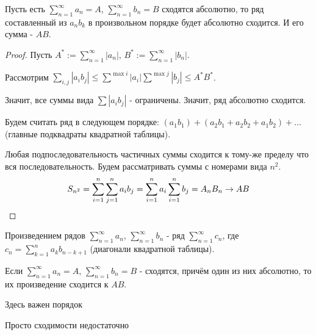 \begin{theorem} \thmslashn

    Пусть есть $\sum\limits_{n=1}^{\infty} a_{n} = A$, $\sum\limits_{n=1}^{\infty} b_{n} = B$ сходятся абсолютно, то ряд составленный из $a_{n}b_{k}$ в произвольном порядке будет абсолютно сходится. И его сумма - $AB$.
    \begin{proof} \thmslashn
    
        Пусть $A^{*} := \sum\limits_{n=1}^{\infty} |a_{n}|$, $B^{*} := \sum\limits_{n=1}^{\infty} |b_{n}|$.

        Рассмотрим $\sum\limits_{i, j} |a_{i}b_{j}| \le \sum\limits_{}^{\max i} |a_{i}| \sum\limits_{}^{\max j} |b_{j}|  \le A^{*}B^{*}$.

        Значит, все суммы вида $\sum |a_{i}b_{j}|$ - ограничены. Значит, ряд абсолютно сходится.

        Будем считать ряд в следующем порядке: $(a_1b_1) + (a_2b_1 + a_2b_2+a_1b_2) + \ldots$ (главные подквадраты квадратной таблицы).

        Любая подпоследовательность частичных суммы сходится к тому-же пределу что вся последовательность. Будем рассматривать суммы с номерами вида $n^2$.
        \begin{equation*}
            S_{n^2} = \sum\limits_{i=1}^{n}\sum\limits_{j=1}^{n} a_{i}b_{j} = \sum\limits_{i=1}^{n} a_{i} \sum\limits_{i=1}^{n} b_{j} = A_{n}B_{n} \to AB \qedhere
        \end{equation*}
    \end{proof}
\end{theorem}
\begin{definition} \thmslashn 

    Произведением рядов $\sum\limits_{n=1}^{\infty} a_{n}$, $\sum\limits_{n=1}^{\infty} b_{n}$ - ряд $\sum\limits_{n=1}^{\infty} c_{n}$, где $c_{n} = \sum\limits_{k=1}^{n} a_{k}b_{n-k+1}$ (диагонали квадратной таблицы).
\end{definition}
\begin{theorem} \thmslashn

    Если $\sum\limits_{n=1}^{\infty} a_{n} = A$, $\sum\limits_{n=1}^{\infty} b_{n} = B$ - сходятся, причём один из них абсолютно, то их произведение сходится к $AB$.
\end{theorem}
\begin{remark} \thmslashn

    Здесь важен порядок

    Просто сходимости недостаточно
\end{remark}
